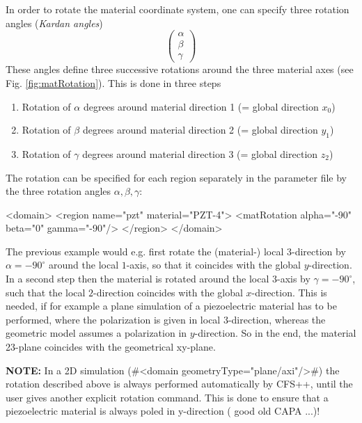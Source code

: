 In order to rotate the material coordinate system, one can specify three
rotation angles (\emph{Kardan angles})
\begin{equation}
\left( 
 \begin{array}{c}
 \alpha \\ \beta \\ \gamma 
 \end{array}
\right)
\end{equation}
These angles define three successive rotations around the three material axes
(see Fig. \ref{fig:matRotation}). This is done in three steps
\begin{enumerate}
 \item Rotation of $\alpha$ degrees around material direction 1 (= global
direction $x_0$)
 \item Rotation of $\beta$ degrees around material direction 2 (= global
direction $y_1$)
 \item Rotation of $\gamma$ degrees around material direction 3 (= global
direction $z_2$)
\end{enumerate}
The rotation can be specified for each region separately in the parameter file
by the three rotation angles $\alpha, \beta, \gamma$:
\begin{xmllisting}
  <domain>
    <region name="pzt" material="PZT-4">
      <matRotation alpha="-90" beta="0" gamma="-90"/>
    </region>
  </domain>
\end{xmllisting}
The previous example would e.g. first rotate the (material-) local $3$-direction
by $\alpha=-90^\circ$ around the local $1$-axis, so that it coincides with the
global $y$-direction. In a second step then the material is rotated around the
local $3$-axis by $\gamma=-90^\circ$, such that the local $2$-direction
coincides with the global $x$-direction. 
This is needed, if for example a plane simulation of a piezoelectric material
has to be performed, where the polarization is given in local $3$-direction,
whereas the geometric model assumes a polarization in $y$-direction. So in the
end, the material 23-plane coincides with the geometrical xy-plane.
\newline

{\bf NOTE:} In a 2D simulation (\myverb#<domain geometryType="plane/axi"/>#) the
rotation described above is always performed automatically by CFS++, until the
user gives another explicit rotation command. This is done to ensure that a
piezoelectric material is always poled in y-direction ( good old CAPA ...)!
\newline

